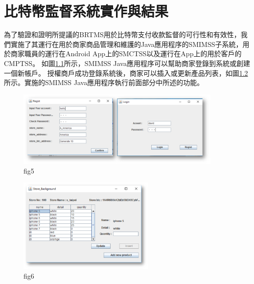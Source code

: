 
\chapter{比特幣監督系統實作與結果}
為了驗證和證明所提議的BRTMS用於比特幣支付收款監督的可行性和有效性，我們實施了其運行在用於商家商品管理和維護的Java應用程序的SMIMSS子系統，用於商家職員的運行在Android App上的SMCTSS以及運行在App上的用於客戶的CMPTSS。
如圖\ref{fig5}所示，SMIMSS Java應用程序可以幫助商家登錄到系統或創建一個新帳戶。 授權商戶成功登錄系統後，商家可以插入或更新產品列表，如圖\ref{fig6}所示。實施的SMIMSS Java應用程序執行前面部分中所述的功能。
\begin{figure}[h]
	\centering
	\includegraphics[width = 0.9\textwidth]{fig5.png}
	\caption{fig5}\label{fig5}
\end{figure}
\begin{figure}[h]
	\centering
	\includegraphics[width = 0.6\textwidth]{fig6.png}
	\caption{fig6}\label{fig6}
\end{figure}

